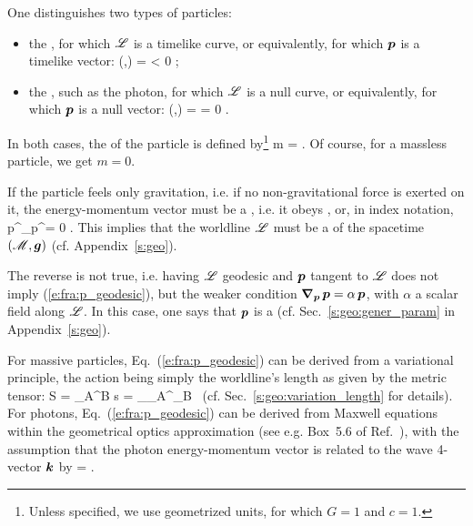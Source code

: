 One distinguishes two types of particles:
\begin{itemize}
\item the , for which
$\mathscr{L}$ is a timelike curve, or equivalently, for which
$\bm{p}$ is a timelike vector:
\be
    (,) = \cdot{} < 0 ;
\ee
\item the ,
such as the photon,
for which $\mathscr{L}$ is a null curve, or equivalently, for which  $\bm{p}$ is a null vector:
\be
    (,) = \cdot{} = 0 .
\ee
\end{itemize}
In both cases, the  of the particle is defined by\footnote{Unless specified, we use geometrized units, for which $G=1$ and $c=1$.}
\be \label{e:fra:def_mass}
   m =  .
\ee
Of course, for a massless particle, we get $m=0$.

If the particle feels only gravitation, i.e. if no non-gravitational force
is exerted on it, the energy-momentum vector must be a
, i.e. it obeys
\be \label{e:fra:p_geodesic}
     ,
\ee
or, in index notation,
\be
    p^\mu \nabla_\mu p^\alpha = 0 .
\ee
This implies that the worldline $\mathscr{L}$ must be a
 of the spacetime $(\mathscr{M},\bm{g})$ (cf. Appendix~\ref{s:geo}).
\begin{remark} \label{r:fra:geodesic_vector}
The reverse is not true, i.e. having $\mathscr{L}$ geodesic and $\bm{p}$
tangent to $\mathscr{L}$ does not imply (\ref{e:fra:p_geodesic}), but the
weaker condition $\bm{\nabla}_{\bm{p}}\,  \bm{p} = \alpha \, \bm{p}$, with $\alpha$
a scalar field along $\mathscr{L}$. In this case, one says that $\bm{p}$ is a
 (cf. Sec.~\ref{s:geo:gener_param}
in Appendix~\ref{s:geo}).
\end{remark}
For massive particles, Eq.~(\ref{e:fra:p_geodesic}) can be derived from
a variational principle, the action being simply the worldline's length
as given by the metric tensor:
\be
    S = \int_A^B \D s = \int_{\lambda_A}^{\lambda_B}
     \, \D\lambda
\ee
(cf. Sec.~\ref{s:geo:variation_length} for details).
For photons, Eq.~(\ref{e:fra:p_geodesic}) can be derived from
Maxwell equations
within the geometrical optics approximation (see e.g. Box~5.6 of Ref.~\cite{PoissW14}),
with the assumption that
the photon energy-momentum vector is related to the wave 4-vector $\bm{k}$ by
\be \label{e:fra:p_hbar_k}
     = \hbar {} .
\ee

